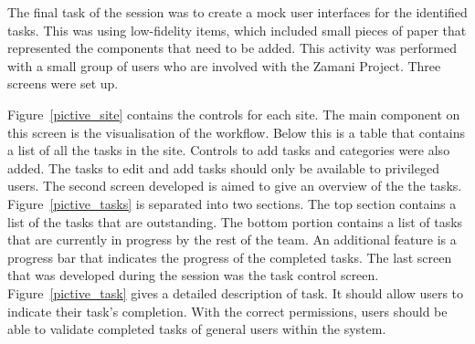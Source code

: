\documentclass[12pt,a4paper]{report}
\begin{document}
The final task of the session was to create a mock user interfaces for the
identified tasks. This was using low-fidelity items, which included small pieces
of paper that represented the components that need to be added. This activity
was performed with a small group of users who are involved with the Zamani Project.
Three screens were set up.

Figure~\ref{pictive_site} contains the controls for each site. The main component
on this screen is the visualisation of the workflow. Below this is a table that
contains a list of all the tasks in the site. Controls to add tasks and categories
were also added. The tasks to edit and add tasks should only be available to privileged
users. The second screen developed is aimed to give an overview of the
the tasks. Figure~\ref{pictive_tasks} is separated into two sections. The top
section contains a list of the tasks that are outstanding. The bottom  portion
contains a list of tasks that are currently in progress by the rest of the team.
An additional feature is a progress bar that indicates the progress of the
completed tasks. The last screen that was developed during the session was the task control
screen. Figure~\ref{pictive_task} gives a detailed description of task. It should
allow users to indicate their task's completion. With the correct permissions,
users should be able to validate completed tasks of general users within the
system.
\end{document}
